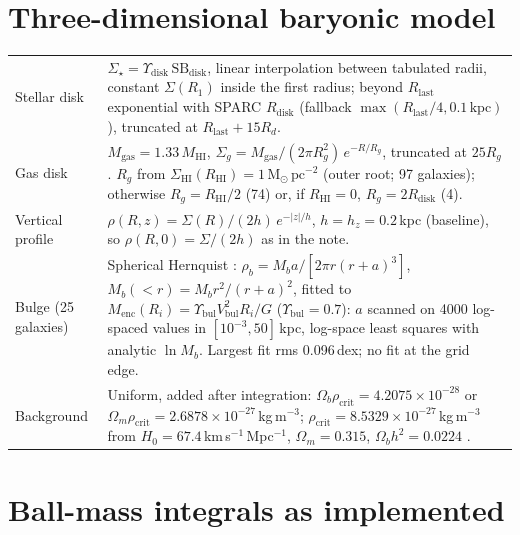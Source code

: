 \documentclass[10pt,a4paper]{article}
\newcommand{\Msun}{\mathrm{M}_\odot}
\begin{document}
\section{Three-dimensional baryonic model}
\begin{tabularx}{\textwidth}{@{}lL@{}}
\toprule
Stellar disk & $\Sigma_\star=\Upsilon_\mathrm{disk}\,\mathrm{SB}_\mathrm{disk}$, linear interpolation between tabulated radii, constant $\Sigma(R_1)$ inside the first radius; beyond $R_\mathrm{last}$ exponential with SPARC $R_\mathrm{disk}$ (fallback $\max(R_\mathrm{last}/4,0.1\,\mathrm{kpc})$), truncated at $R_\mathrm{last}+15R_d$.\\
Gas disk & $M_\mathrm{gas}=1.33\,M_\mathrm{HI}$, $\Sigma_g=M_\mathrm{gas}/(2\pi R_g^2)\,e^{-R/R_g}$, truncated at $25R_g$. $R_g$ from $\Sigma_\mathrm{HI}(R_\mathrm{HI})=1\,\Msun\,\mathrm{pc}^{-2}$ (outer root; 97 galaxies); otherwise $R_g=R_\mathrm{HI}/2$ (74) or, if $R_\mathrm{HI}=0$, $R_g=2R_\mathrm{disk}$ (4).\\
Vertical profile & $\rho(R,z)=\Sigma(R)/(2h)\,e^{-|z|/h}$, $h=h_z=0.2$\,kpc (baseline), so $\rho(R,0)=\Sigma/(2h)$ as in the note.\\
Bulge (25 galaxies) & Spherical Hernquist \cite{hernquist1990}: $\rho_b=M_b a/[2\pi r(r+a)^3]$, $M_b(<r)=M_br^2/(r+a)^2$, fitted to $M_\mathrm{enc}(R_i)=\Upsilon_\mathrm{bul}V_\mathrm{bul}^2R_i/G$ ($\Upsilon_\mathrm{bul}=0.7$): $a$ scanned on 4000 log-spaced values in $[10^{-3},50]$\,kpc, log-space least squares with analytic $\ln M_b$. Largest fit rms 0.096\,dex; no fit at the grid edge.\\
Background & Uniform, added after integration: $\Omega_b\rho_\mathrm{crit}=4.2075\times10^{-28}$ or $\Omega_m\rho_\mathrm{crit}=2.6878\times10^{-27}$\,kg\,m$^{-3}$; $\rho_\mathrm{crit}=8.5329\times10^{-27}$\,kg\,m$^{-3}$ from $H_0=67.4$\,km\,s$^{-1}$\,Mpc$^{-1}$, $\Omega_m=0.315$, $\Omega_bh^2=0.0224$ \cite{planck2018}.\\
\bottomrule
\end{tabularx}

\section{Ball-mass integrals as implemented}
\end{document}
